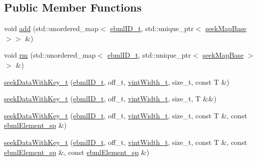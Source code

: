 \subsection*{Public Member Functions}
\begin{DoxyCompactItemize}
\item 
void \mbox{\hyperlink{classebml_1_1seekDataWithKey__t_a4997f1c29bd331a1e6d8c5293f7d4730}{add}} (std\+::unordered\+\_\+map$<$ \mbox{\hyperlink{namespaceebml_a86c5f604ddf12a74aa9812e997a58691}{ebml\+I\+D\+\_\+t}}, std\+::unique\+\_\+ptr$<$ \mbox{\hyperlink{classebml_1_1seekMapBase}{seek\+Map\+Base}} $>$$>$ \&)
\item 
void \mbox{\hyperlink{classebml_1_1seekDataWithKey__t_afc028f689e5c536e26ca8619d6dbb0a2}{rm}} (std\+::unordered\+\_\+map$<$ \mbox{\hyperlink{namespaceebml_a86c5f604ddf12a74aa9812e997a58691}{ebml\+I\+D\+\_\+t}}, std\+::unique\+\_\+ptr$<$ \mbox{\hyperlink{classebml_1_1seekMapBase}{seek\+Map\+Base}} $>$$>$ \&)
\item 
\mbox{\hyperlink{classebml_1_1seekDataWithKey__t_a01ce559343d7fd9ab658f3b71d6ed448}{seek\+Data\+With\+Key\+\_\+t}} (\mbox{\hyperlink{namespaceebml_a86c5f604ddf12a74aa9812e997a58691}{ebml\+I\+D\+\_\+t}}, off\+\_\+t, \mbox{\hyperlink{namespaceebml_a2ccdfb60b23efb51fe07f9d066e23604}{vint\+Width\+\_\+t}}, size\+\_\+t, const T \&)
\item 
\mbox{\hyperlink{classebml_1_1seekDataWithKey__t_abe19a3272fbe18811c86e08cb0eba108}{seek\+Data\+With\+Key\+\_\+t}} (\mbox{\hyperlink{namespaceebml_a86c5f604ddf12a74aa9812e997a58691}{ebml\+I\+D\+\_\+t}}, off\+\_\+t, \mbox{\hyperlink{namespaceebml_a2ccdfb60b23efb51fe07f9d066e23604}{vint\+Width\+\_\+t}}, size\+\_\+t, T \&\&)
\item 
\mbox{\hyperlink{classebml_1_1seekDataWithKey__t_a2e92d63c712630d15c19742fb215f512}{seek\+Data\+With\+Key\+\_\+t}} (\mbox{\hyperlink{namespaceebml_a86c5f604ddf12a74aa9812e997a58691}{ebml\+I\+D\+\_\+t}}, off\+\_\+t, \mbox{\hyperlink{namespaceebml_a2ccdfb60b23efb51fe07f9d066e23604}{vint\+Width\+\_\+t}}, size\+\_\+t, const T \&, const \mbox{\hyperlink{namespaceebml_adad533b7705a16bb360fe56380c5e7be}{ebml\+Element\+\_\+sp}} \&)
\item 
\mbox{\hyperlink{classebml_1_1seekDataWithKey__t_a8d13d1e10002ba82e2f8c9be9ed60464}{seek\+Data\+With\+Key\+\_\+t}} (\mbox{\hyperlink{namespaceebml_a86c5f604ddf12a74aa9812e997a58691}{ebml\+I\+D\+\_\+t}}, off\+\_\+t, \mbox{\hyperlink{namespaceebml_a2ccdfb60b23efb51fe07f9d066e23604}{vint\+Width\+\_\+t}}, size\+\_\+t, const T \&, const \mbox{\hyperlink{namespaceebml_adad533b7705a16bb360fe56380c5e7be}{ebml\+Element\+\_\+sp}} \&, const \mbox{\hyperlink{namespaceebml_adad533b7705a16bb360fe56380c5e7be}{ebml\+Element\+\_\+sp}} \&)

\end{DoxyCompactItemize}
